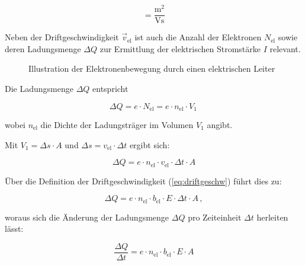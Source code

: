 {\begin{equation*}
	[b_\mathrm{el}] = \frac{\mathrm{m}^2}{\mathrm{Vs}}
\end{equation*}




Neben der Driftgeschwindigkeit $\vec{v}_\mathrm{el}$ ist auch die Anzahl der Elektronen $N_\mathrm{el}$
sowie deren Ladungsmenge $\Delta Q$ zur Ermittlung der elektrischen Stromstärke $I$ relevant.

\begin{figure}[ht]
	\centering
	
	\caption{Illustration der Elektronenbewegung durch einen elektrischen Leiter}

	\label{fig:strom1}
\end{figure}

 
Die Ladungsmenge $\Delta Q$ entspricht

\begin{equation*}	
	\Delta Q = e \cdot N_\mathrm{el} = e \cdot n_\mathrm{el} \cdot V_1 \,
\end{equation*}

wobei $n_\mathrm{el}$ die Dichte der Ladungsträger im Volumen $V_1$ angibt.

Mit $V_1 = \Delta s \cdot A$ und $\Delta s = v_\mathrm{el}  \cdot \Delta t$ ergibt sich: 

\begin{equation*}	
	\Delta Q =  e \cdot n_\mathrm{el} \cdot v_\mathrm{el} \cdot \Delta t \cdot A
\end{equation*}

Über die Definition der Driftgeschwindigkeit (\ref{eq:driftgeschw}) führt dies zu:

\begin{equation*}	
	\Delta Q =  e \cdot n_\mathrm{el} \cdot b_\mathrm{el} \cdot E \cdot \Delta t \cdot A \, ,
\end{equation*}

woraus sich die Änderung der Ladungsmenge $\Delta Q$ pro Zeiteinheit $\Delta t$ herleiten lässt:

\begin{equation*}	
	\frac{\Delta Q}{\Delta t} =  e \cdot n_\mathrm{el} \cdot b_\mathrm{el} \cdot E \cdot A
\end{equation*}




}

